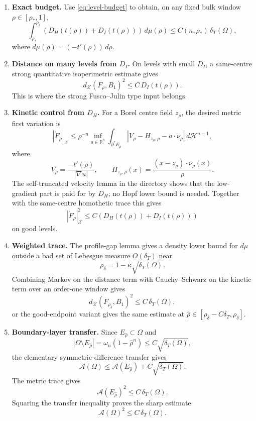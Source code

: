 \documentclass[11pt]{article}
\theoremstyle{definition}
\newcommand{\R}{\mathbb R}
\newcommand{\dT}{\delta_T}
\newcommand{\Fr}{\mathcal A}
\newcommand{\HH}{\mathcal H}
\newcommand{\X}{\mathcal X}
\begin{document}
\begin{enumerate}[label=\textbf{Step \arabic*.},leftmargin=3em]
\item \textbf{Exact budget.}
Use \eqref{eq:level-budget} to obtain, on any fixed bulk window
\(\rho\in[\rho_*,1]\),
\[
   \int_{\rho_*}^{\rho_\delta}
   (D_H(t(\rho))+D_I(t(\rho)))\,d\mu(\rho)
   \le C(n,\rho_*)\,\dT(\Omega),
\]
where \(d\mu(\rho)=(-t'(\rho))\,d\rho\).

\item \textbf{Distance on many levels from \(D_I\).}
On levels with small \(D_I\), a same-centre strong quantitative
isoperimetric estimate gives
\[
   d_\X(F_\rho,B_1)^2\le C\,D_I(t(\rho)).
\]
This is where the strong Fusco--Julin type input belongs.

\item \textbf{Kinetic control from \(D_H\).}
For a Borel centre field \(z_\rho\), the desired metric first variation is
\[
   |\dot F_\rho|_\X
   \le
   \rho^{-n}\inf_{a\in\R^n}
   \int_{\partial^*E_\rho}
   |V_\rho-H_{z_\rho,\rho}-a\cdot\nu_\rho|\,d\HH^{n-1},
\]
where
\[
   V_\rho=\frac{-t'(\rho)}{|\nabla u|},\qquad
   H_{z_\rho,\rho}(x)=\frac{(x-z_\rho)\cdot\nu_\rho(x)}{\rho}.
\]
The self-truncated velocity lemma in the directory shows that the
low-gradient part is paid for by \(D_H\); no Hopf lower bound is needed.
Together with the same-centre homothetic trace this gives
\[
   |\dot F_\rho|_\X^2\le C(D_H(t(\rho))+D_I(t(\rho)))
\]
on good levels.

\item \textbf{Weighted trace.}
The profile-gap lemma gives a density lower bound for \(d\mu\) outside a
bad set of Lebesgue measure \(O(\dT)\) near
\[
   \rho_\delta=1-\kappa\sqrt{\dT(\Omega)}.
\]
Combining Markov on the distance term with Cauchy--Schwarz on the kinetic
term over an order-one window gives
\[
   d_\X(F_{\rho_\delta},B_1)^2\le C\,\dT(\Omega),
\]
or the good-endpoint variant gives the same estimate at
\(\widehat\rho\in[\rho_\delta-C\dT,\rho_\delta]\).

\item \textbf{Boundary-layer transfer.}
Since \(E_{\widehat\rho}\subset\Omega\) and
\[
   |\Omega\setminus E_{\widehat\rho}|
   =
   \omega_n(1-\widehat\rho^n)
   \le C\sqrt{\dT(\Omega)},
\]
the elementary symmetric-difference transfer gives
\[
   \Fr(\Omega)
   \le
   \Fr(E_{\widehat\rho})
   +C\sqrt{\dT(\Omega)}.
\]
The metric trace gives
\[
   \Fr(E_{\widehat\rho})^2\le C\,\dT(\Omega).
\]
Squaring the transfer inequality proves the sharp estimate
\[
   \Fr(\Omega)^2\le C\,\dT(\Omega).
\]
\end{enumerate}
\end{document}
